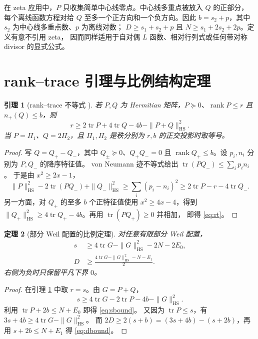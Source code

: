 \documentclass[UTF8,11pt,a4paper]{ctexart}
\newtheorem{theorem}{定理}[section]
\newtheorem{lemma}[theorem]{引理}
\theoremstyle{definition}
\theoremstyle{remark}
\newcommand{\tr}{\operatorname{tr}}
\newcommand{\rank}{\operatorname{rank}}
\newcommand{\HS}{\mathrm{HS}}
\begin{document}
在 zeta 应用中，$P$ 只收集简单中心线零点。中心线多重点被放入 $Q$ 的正部分，
每个离线函数方程对给 $Q$ 至多一个正方向和一个负方向。因此
$b=s_2+p$，其中 $s_2$ 为中心线多重点数、$p$ 为离线对数；
$D\ge s_1+s_2+p$ 且 $N\ge s_1+2s_2+2p$。定义有意不引用 zeta，
因而同样适用于自对偶 $L$ 函数、相对行列式或任何带对称 divisor 的显式公式。

\section{rank--trace 引理与比例结构定理}

\begin{lemma}[rank--trace 不等式 {\cite[Lemma 3.2]{AF26}}]\label{lem:rt}
若 $P,Q$ 为 Hermitian 矩阵，$P\succeq0$、$\rank P\le r$ 且
$n_+(Q)\le b$，则
\begin{equation}\label{eq:rt}
 r\ge 2\tr P+4\tr Q-4b-\|P+Q\|_{\HS}^2.
\end{equation}
当 $P=\Pi_1$、$Q=2\Pi_2$，且 $\Pi_1,\Pi_2$ 是秩分别为 $r,b$
的正交投影时取等号。
\end{lemma}

\begin{proof}
写 $Q=Q_+-Q_-$，其中 $Q_\pm\succeq0$、$Q_+Q_-=0$ 且
$\rank Q_+\le b$。设 $p_i,n_i$ 分别为 $P,Q_-$ 的降序特征值。
von Neumann 迹不等式给出 $\tr(PQ_-)\le\sum_i p_i n_i$。
于是由 $x^2\ge2x-1$，
\[
 \|P\|_{\HS}^2-2\tr(PQ_-)+\|Q_-\|_{\HS}^2
 \ge \sum_i(p_i-n_i)^2
 \ge 2\tr P-r-4\tr Q_-.
\]
另一方面，对 $Q_+$ 的至多 $b$ 个正特征值使用 $x^2\ge4x-4$，得到
$\|Q_+\|_{\HS}^2\ge4\tr Q_+-4b$。再用 $\tr(PQ_+)\ge0$ 并相加，
即得 \eqref{eq:rt}。
\end{proof}

\begin{theorem}[部分 Weil 配置的比例定理]\label{thm:partial}
对任意有限部分 Weil 配置，
\begin{align}
 s&\ge4\tr G-\|G\|_{\HS}^2-2N-2E_0, \label{eq:sbound}\\
 D&\ge\frac{4\tr G-\|G\|_{\HS}^2-N-E_1}{2}. \label{eq:dbound}
\end{align}
右侧为负时只保留平凡下界 $0$。
\end{theorem}

\begin{proof}
在引理 \ref{lem:rt} 中取 $r=s$。由 $G=P+Q$，
\[
 s\ge4\tr G-2\tr P-4b-\|G\|_{\HS}^2.
\]
利用 $\tr P+2b\le N+E_0$ 即得 \eqref{eq:sbound}。
又因为 $\tr P\le s$，有 $3s+4b\ge4\tr G-\|G\|_{\HS}^2$。
而 $2D\ge2(s+b)=(3s+4b)-(s+2b)$，再用
$s+2b\le N+E_1$ 得 \eqref{eq:dbound}。
\end{proof}
\end{document}
